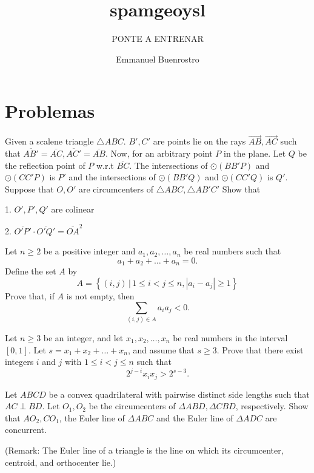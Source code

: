 \documentclass[11pt]{scrartcl}
\title{spamgeoysl}
\subtitle{PONTE A ENTRENAR}
\author{Emmanuel Buenrostro}
\begin{document}
\maketitle

\section{Problemas}
\begin{problem}[1810915585111530473]
	Given a scalene triangle $ \triangle ABC $. $ B', C' $ are points lie on the rays $ \overrightarrow{AB}, \overrightarrow{AC}  $ such that $ \overline{AB'} = \overline{AC}, \overline{AC'} = \overline{AB} $. Now, for an arbitrary point $ P $ in the plane. Let $ Q $ be the reflection point of $ P $ w.r.t $ \overline{BC} $. The intersections of $ \odot{\left(BB'P\right)} $ and $ \odot{\left(CC'P\right)} $ is $ P' $ and the intersections of $ \odot{\left(BB'Q\right)} $ and $ \odot{\left(CC'Q\right)} $ is $ Q' $. Suppose that $ O, O' $ are circumcenters of $ \triangle{ABC}, \triangle{AB'C'} $ Show that

1. $ O', P', Q' $ are colinear

2. $  \overline{O'P'} \cdot  \overline{O'Q'} = \overline{OA}^{2} $
\end{problem}
\begin{problem}[781756252908608]
Let $n\geqslant 2$ be a positive integer and $a_1,a_2, \ldots ,a_n$ be real numbers such that\[a_1+a_2+\dots+a_n=0.\]Define the set $A$ by
\[A=\left\{(i, j)\,|\,1 \leqslant i<j \leqslant n,\left|a_{i}-a_{j}\right| \geqslant 1\right\}\]Prove that, if $A$ is not empty, then
\[\sum_{(i, j) \in A} a_{i} a_{j}<0.\]
\end{problem}
\begin{problem}[7550072974614174968]
Let $n \geqslant 3$ be an integer, and let $x_1,x_2,\ldots,x_n$ be real numbers in the interval $[0,1]$. Let $s=x_1+x_2+\ldots+x_n$, and assume that $s \geqslant 3$. Prove that there exist integers $i$ and $j$ with $1 \leqslant i<j \leqslant n$ such that
\[2^{j-i}x_ix_j>2^{s-3}.\]
\end{problem}
\begin{problem}[8963205841174892420]
	Let $ABCD$ be a convex quadrilateral with pairwise distinct side lengths such that $AC\perp BD$. Let $O_1,O_2$ be the circumcenters of $\Delta ABD, \Delta CBD$, respectively. Show that $AO_2, CO_1$, the Euler line of $\Delta ABC$ and the Euler line of $\Delta ADC$ are concurrent.

(Remark: The Euler line of a triangle is the line on which its circumcenter, centroid, and orthocenter lie.)
\end{problem}
\end{document}
